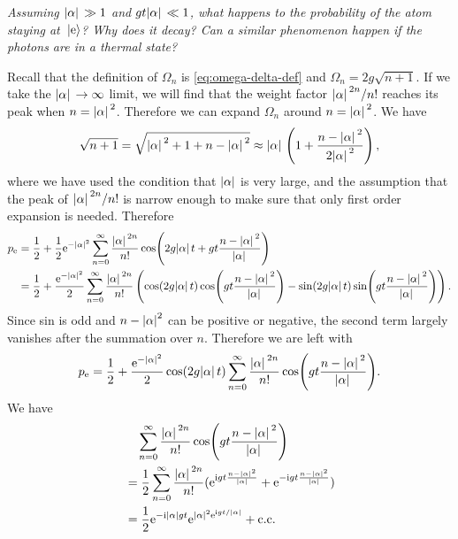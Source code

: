 \documentclass[hyperref, a4paper]{article}
\newcommand*{\ii}{\mathrm{i}}
\newcommand*{\ee}{\mathrm{e}}
\newcommand*{\kete}{\ket*{\text{e}}}
\newcommand*{\pope}{p_{\text{e}}}
\begin{document}
\textit{Assuming $\abs*{\alpha} \gg 1$ and $g t \abs*{\alpha} \ll 1$, what happens to the probability of the atom staying at $\kete$? Why does it decay? Can a similar phenomenon happen if the photons are in a thermal state?}

Recall that the definition of $\Omega_n$ is \eqref{eq:omega-delta-def}
and $\Omega_n = 2 g \sqrt{n+1}$.
If we take the $\abs*{\alpha} \to \infty$ limit,
we will find that the weight factor $\abs*{\alpha}^{2n} / n!$ reaches its peak when $n = \abs*{\alpha}^2$.
Therefore we can expand $\Omega_n$ around $n = \abs*{\alpha}^2$.
We have 
\[
    \sqrt{n+1} = \sqrt{\abs*{\alpha}^2 + 1 + n - \abs*{\alpha}^2 }
    \approx \abs*{\alpha} \left( 1 + \frac{n - \abs*{\alpha}^2 }{2 \abs*{\alpha}^2} \right),
\]
where we have used the condition that $\abs{\alpha}$ is very large, 
and the assumption that the peak of  $\abs*{\alpha}^{2n} / n!$ is narrow enough 
to make sure that only first order expansion is needed.
Therefore 
\begin{equation}
    \begin{aligned}
        \pope &= \frac{1}{2} + \frac{1}{2} \ee^{- \abs*{\alpha}^2} \sum_{n=0}^{\infty} \frac{\abs*{\alpha}^{2n}}{n!} 
        \cos(
            2 g \abs*{\alpha} t + g t \frac{n - \abs*{\alpha}^2}{\abs*{\alpha}}
        ) \\
        &= \frac{1}{2} + \frac{\ee^{- \abs*{\alpha}^2}}{2} \sum_{n=0}^{\infty} \frac{\abs*{\alpha}^{2n}}{n!} 
        \left(\cos( 2 g \abs*{\alpha} t) \cos(
            g t \frac{n - \abs*{\alpha}^2 }{\abs*{\alpha}}
        ) - \sin( 2 g \abs*{\alpha} t) \sin(
            g t \frac{n - \abs*{\alpha}^2 }{\abs*{\alpha}}
        )\right).
    \end{aligned}
\end{equation}
Since sin is odd and $n - \abs{\alpha}^2$ can be positive or negative,
the second term largely vanishes after the summation over $n$.
Therefore we are left with 
\begin{equation}
    \begin{aligned}
        \pope = \frac{1}{2} + \frac{\ee^{- \abs*{\alpha}^2}}{2} 
        \cos( 2 g \abs*{\alpha} t)  \sum_{n=0}^{\infty} \frac{\abs*{\alpha}^{2n}}{n!} 
        \cos(
            g t \frac{n - \abs*{\alpha}^2 }{\abs*{\alpha}}
        ).
    \end{aligned}
\end{equation}
We have 
\[
    \begin{aligned}
        &\quad \sum_{n=0}^{\infty} \frac{\abs*{\alpha}^{2n}}{n!} 
        \cos(
            g t \frac{n - \abs*{\alpha}^2 }{\abs*{\alpha}}
        ) \\
        &= \frac{1}{2} \sum_{n=0}^{\infty} \frac{\abs*{\alpha}^{2n}}{n!} 
        (
            \ee^{\ii g t \frac{n - \abs*{\alpha}^2 }{\abs*{\alpha}}}
            + \ee^{-\ii g t \frac{n - \abs*{\alpha}^2 }{\abs*{\alpha}}}
        ) \\
        &= \frac{1}{2} \ee^{- \ii \abs{\alpha} g t} \ee^{\abs{\alpha}^2 \ee^{\ii g t / \abs{\alpha}}} + \text{c.c.}
    \end{aligned}
\]
\end{document}
